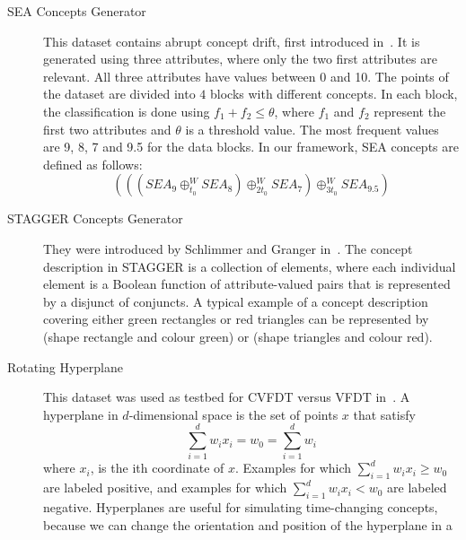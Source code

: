 \begin{description} %
 \item[SEA Concepts Generator] This dataset contains abrupt concept drift, 
first introduced  in~\cite{sea}. It is generated using three attributes,
where only the two first attributes are relevant. 
All three attributes have values between 0 and 10.
The points of the dataset are divided into $4$ blocks with different concepts. 
In each block,  the classification is done using $f_1+ f_2 \leq \theta$, 
where $f_1$ and $f_2$ represent the first two attributes 
and $\theta$ is a threshold value. 
The most frequent values are 9, 8, 7 and 9.5 for the data blocks. 
In our framework, SEA concepts are defined as follows:
$$( ( (SEA_9 \oplus^{W}_{t_0}  SEA_8) \oplus^{W}_{2t_0} SEA_7) \oplus^{W}_{3t_0} SEA_{9.5} )  $$ 
 \item[STAGGER Concepts Generator] %
They were introduced by Schlimmer and Granger in~\cite{SchlimmerG86}.
The concept description in STAGGER is a collection of elements, where each 
individual element is a Boolean function of attribute-valued pairs that is 
represented by a disjunct of conjuncts. A typical example of a concept description
covering either green rectangles or red triangles can be represented by (shape 
rectangle and colour green) or (shape triangles and colour red).
 \item[Rotating Hyperplane]%
This dataset was used as testbed for CVFDT 
versus VFDT in~\cite{hulten-mining}. A hyperplane in $d$-dimensional space is the
set of points $x$ that satisfy $$ \sum^{d}_{i=1} w_i x_i = w_0 = \sum^{d}_{i=1} w_i  $$
where $x_i$, is the ith coordinate of $x$. Examples for which $ \sum^{d}_{i=1} w_i x_i \ge w_0 $  
are labeled positive, and examples for which  $ \sum^{d}_{i=1} w_i x_i < w_0 $
are labeled negative. 
Hyperplanes are useful for simulating time-changing concepts, because we can
change the orientation and position of the hyperplane in a

\end{description}
